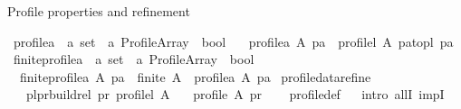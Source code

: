 \begin{isabellebody}
\begin{isamarkuptext}%
Profile properties and refinement%
\end{isamarkuptext}\isamarkuptrue%
\isamarkupfalse%
\ profile{\isacharunderscore}{\kern0pt}a\ {\isacharcolon}{\kern0pt}{\isacharcolon}{\kern0pt}\ {\isachardoublequoteopen}{\isacharprime}{\kern0pt}a\ set\ {\isasymRightarrow}\ {\isacharprime}{\kern0pt}a\ Profile{\isacharunderscore}{\kern0pt}Array\ {\isasymRightarrow}\ bool{\isachardoublequoteclose}\ \isanewline
\ \ {\isachardoublequoteopen}profile{\isacharunderscore}{\kern0pt}a\ A\ pa\ {\isacharequal}{\kern0pt}\ profile{\isacharunderscore}{\kern0pt}l\ A\ {\isacharparenleft}{\kern0pt}pa{\isacharunderscore}{\kern0pt}to{\isacharunderscore}{\kern0pt}pl\ pa{\isacharparenright}{\kern0pt}{\isachardoublequoteclose}\isanewline
\isanewline
{}\isamarkupfalse%
\ finite{\isacharunderscore}{\kern0pt}profile{\isacharunderscore}{\kern0pt}a\ {\isacharcolon}{\kern0pt}{\isacharcolon}{\kern0pt}\ {\isachardoublequoteopen}{\isacharprime}{\kern0pt}a\ set\ {\isasymRightarrow}\ {\isacharprime}{\kern0pt}a\ Profile{\isacharunderscore}{\kern0pt}Array\ {\isasymRightarrow}\ bool{\isachardoublequoteclose}\ \isanewline
\ \ {\isachardoublequoteopen}finite{\isacharunderscore}{\kern0pt}profile{\isacharunderscore}{\kern0pt}a\ A\ pa\ {\isasymequiv}\ finite\ A\ {\isasymand}\ profile{\isacharunderscore}{\kern0pt}a\ A\ pa{\isachardoublequoteclose}\isanewline
\isanewline
{}\isamarkupfalse%
\ profile{\isacharunderscore}{\kern0pt}data{\isacharunderscore}{\kern0pt}refine{\isacharcolon}{\kern0pt}\ \isanewline
\ \ \ {\isachardoublequoteopen}{\isacharparenleft}{\kern0pt}pl{\isacharcomma}{\kern0pt}pr{\isacharparenright}{\kern0pt}{\isasymin}build{\isacharunderscore}{\kern0pt}rel\ pr{}{\isacharunderscore}{\kern0pt}{\isasymalpha}\ {\isacharparenleft}{\kern0pt}profile{\isacharunderscore}{\kern0pt}l\ A{\isacharparenright}{\kern0pt}{\isachardoublequoteclose}\isanewline
\ \ \ {\isachardoublequoteopen}profile\ A\ pr{\isachardoublequoteclose}\isanewline
%
\isadelimproof
\ \ %
\endisadelimproof
%
\isatagproof
{}\isamarkupfalse%
\ profile{\isacharunderscore}{\kern0pt}def\isanewline
\ \ \isamarkupfalse%
{\isacharparenleft}{\kern0pt}intro\ allI\ impI{\isacharparenright}{\kern0pt}\isanewline
{}\isamarkupfalse%
\ {\isacharparenleft}{\kern0pt}{\isacharminus}{\kern0pt}{\isacharparenright}{\kern0pt}\isanewline
\ \ \isamarkupfalse%

\end{isabellebody}
